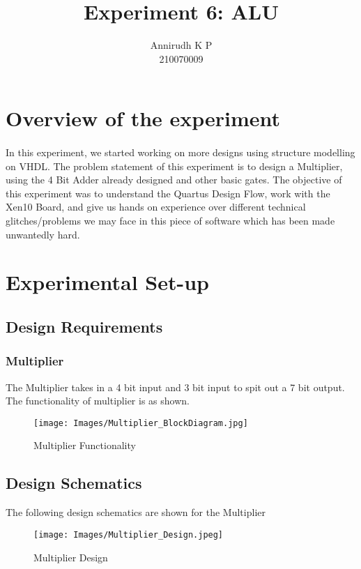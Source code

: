 \documentclass[12pt]{article}
\title{Experiment 6: ALU}
\author{Annirudh K P\\%
210070009}
\begin{document}
\maketitle

\section{Overview of the experiment}
\paragraph{}
In this experiment, we started working on more designs using structure modelling on VHDL. The problem statement of this experiment is to design a Multiplier, using the 4 Bit Adder already designed and other basic gates. The objective of this experiment was to understand the Quartus Design Flow, work with the Xen10 Board, and give us hands on experience over different technical glitches/problems we may face in this piece of software which has been made unwantedly hard.

\section{Experimental Set-up}

\subsection{Design Requirements}
\subsubsection{Multiplier}
The Multiplier takes in a 4 bit input and 3 bit input to spit out a 7 bit output. The functionality of multiplier is as shown.

\begin{figure}[H]
\centering
  \texttt{[image: Images/Multiplier\_BlockDiagram.jpg]}
  \caption{Multiplier Functionality}
\end{figure}


\subsection{Design Schematics}
The following design schematics are shown for the Multiplier 

\begin{figure}[H]
\centering
  \texttt{[image: Images/Multiplier\_Design.jpeg]}
  \caption{Multiplier Design}
\end{figure}
\end{document}
